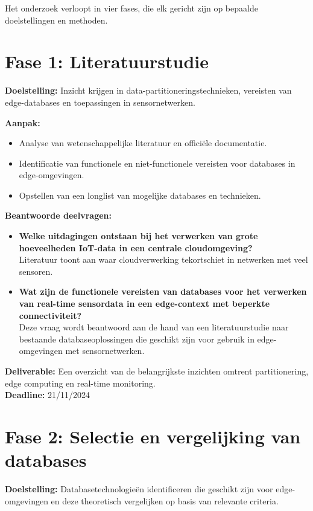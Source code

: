 Het onderzoek verloopt in vier fases, die elk gericht zijn op bepaalde doelstellingen en methoden. \\

\section*{Fase 1: Literatuurstudie}

\textbf{Doelstelling:}  
Inzicht krijgen in data-partitioneringstechnieken, vereisten van edge-databases en toepassingen in sensornetwerken.

\textbf{Aanpak:}
\begin{itemize}
    \item Analyse van wetenschappelijke literatuur en officiële documentatie.
    \item Identificatie van functionele en niet-functionele vereisten voor databases in edge-omgevingen.
    \item Opstellen van een longlist van mogelijke databases en technieken.
\end{itemize}

\textbf{Beantwoorde deelvragen:}
\begin{itemize}
    \item \textbf{Welke uitdagingen ontstaan bij het verwerken van grote hoeveelheden IoT-data in een centrale cloudomgeving?} \\ 
    Literatuur toont aan waar cloudverwerking tekortschiet in netwerken met veel sensoren.
    \item \textbf{Wat zijn de functionele vereisten van databases voor het verwerken van real-time sensordata in een edge-context met beperkte connectiviteit?} \\
    Deze vraag wordt beantwoord aan de hand van een literatuurstudie naar bestaande databaseoplossingen die geschikt zijn voor gebruik in edge-omgevingen met sensornetwerken.
\end{itemize}

\textbf{Deliverable:} Een overzicht van de belangrijkste inzichten omtrent partitionering, edge computing en real-time monitoring. \\
\textbf{Deadline:} 21/11/2024

\section*{Fase 2: Selectie en vergelijking van databases}

\textbf{Doelstelling:}  
Databasetechnologieën identificeren die geschikt zijn voor edge-omgevingen en deze theoretisch vergelijken op basis van relevante criteria.

